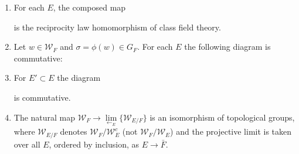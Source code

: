 \documentclass[12pt,a4paper,english]{article}
\theoremstyle{definition}
\theoremstyle{plain}
\begin{document}
\begin{enumerate}
    \item For each $E$, the composed map

    is the reciprocity law homomorphism of class field theory.
    \item Let $w\in \mathcal{W}_{F}$ and $\sigma=\phi(w)\in G_{F}$. For each $E$ the following diagram is commutative:
 
 \begin{center}
\end{center}
\item For $E'\subset E$ the diagram



is commutative.

\item The natural map $\mathcal{W}_{F}\rightarrow \lim\limits_{\leftarrow_{E}}\{\mathcal{W}_{E/F}\}$ is an isomorphism of topological groups, where $\mathcal{W}_{E/F}$ denotes $\mathcal{W}_{F}/\mathcal{W}^{c}_{E}$ (not $\mathcal{W}_{F}/\mathcal{W}_{E}$) and the projective limit is taken over all $E$, ordered by inclusion, as $E\rightarrow\bar{F}$. 

\end{enumerate}
\end{document}
